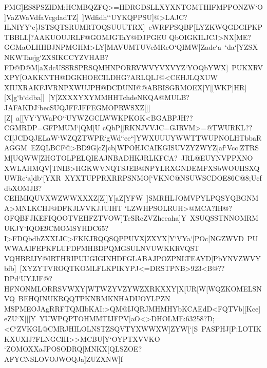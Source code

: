 {{ \hbox{PMG]ES8PSZIDM;HCMBQZFQ>=HDRGDSLLXYXNTGMTHIFMPPONZW`O]VaZWaVdfaVcgdadTZ]%
 ]Wdfidh``UYKQPPSU]@>LAJC?ILNIYY`c[JSTSQTSRUMRTOQSUUUTRX]%
 eWRFPSQBP[LYZKWQGDGIPKPTBBLL[?AAKUOUJRLF@GOMJGTaY@DJPGEU}
 \hbox{QbOIGKILJCJ>NX[ME?GGMaOLHHBJNPMGHM>LY]MAVUMTUVeMRcO`QIMW]Zadc`a%
 `da`[YZSXNKWTaejg`ZXSIKCCYZVHAB?FD@D@M]aXdcUSSRSPRSQMHNPORRVWVYVXVYZ`YOQbYWX]%
 PUKXRVXPY[OAKKNTH@DGKHOECILDHG?ARLQLJ@<CEHJLQXUW}
 \hbox{XIUXRAKFJVRNPXWUJPH@DCDUNI@@ABBISGRMOEX[Y[[WKP]HR][X]g`b`ddba]]%
 [Y[ZXXXYXYMMHHTchdeNKQA@MULB?JAFAKDJ`becSUQJFFJFFEGMOPRWSXZ[]][Z[%
 a[[VY`YWaPO``UYWZGCLWWKPKOK<BGABPJH??CGMRDP=GFPMUM`[QM[U}
 \hbox{cQbP]]RKNJVVJC=GJRVM>=@TWURKL??CI[JCDQJELaW`WZQZTWPR`gWd``ee``]YWXUUUYWWTTWUPNOLHTbbaRAGGM%
 EZQLBCF@>BD9G[cZ]cb[WPOHJCAIKGISUVZYZWYZ[af`Vcc[ZTRSM[UQWW[ZHGTOLPELQIEAJNBADHKJRLKFCA?%
 JRL@EUYNVPPXNO}
 \hbox{XWLAHMQV]TNIB>HGKWVNQTSJEB@NPYLRXGNDEMFXSbWOUHSXQUWRe`a]db`[YXR%
 XYXTUPPRXRRPSNMO[`VKNC@NSUWSCDOE86C@8;UcfdbXOMJB?CEHMIQUVXWZWWXXXZ[Z]]Y[aZ[YFW%
 ]SMRHLJOMVPYLPQSYQBGNMA>MNLKCHJ@DFKJLVVKJJUIHT}
 \hbox{`LZWHPSOLRUH>@MCA?IH@?OFQBFJKEFIQOOTVEHFZTVOW]TcSRcZVZheeaha]Y%
 XSUQSSTNNOMRMUKJY`IQOE9CMOMSYHDC65?I>FDQbdbZXXLIC>FKKJRQQSQPPUVX]ZXYX[Y`VYa`[POc[NGZWVD%
 PUWWAAIFEPKFLUFDFMHBDPQMGSULNVUWKKRVQST}
 \hbox{VQHBRIJY@IRTHRIPUUGIGINHDFGLABAJPOZPNLTEAYD]PbYNVZWVYbfb]%
 [XYZYTVROQTKOMLFLKPIKYPJ<=DRSTPNB>923<B@??DPd`UYJJF@?HFNONMLORRSVWXY[WTWZYVZYWZXRKXXY[X[UR[W[WQZKOMELSNVQ%
 BEHQINUKRQQTPKNRMKNHADUOYLPZN}
 \hbox{MSPMEOJAgRRFTQMIbKAI:>QM@IJQRJMHMHYbKCAEdD<FQTVb[[Kce]eZU`X][]Y%
 YUWPQPTOHMMTIJFPV[aO<>DHOLME:63258?D;=<C`ZVKGL@CMRJHILOLNSTZSQVTYXWWXW]ZYW[`[S%
 PASPHJ[P:LOTIKKXUXIJ?FLNGCIH>>MCBU[Y`OYPTXVVKO}
 \hbox{`ZOMOXXaJPOSODRQ[MNKX[QLSZOE?AFYCNSLOVOJWOQJa]ZUZXNW]f%
}}}
